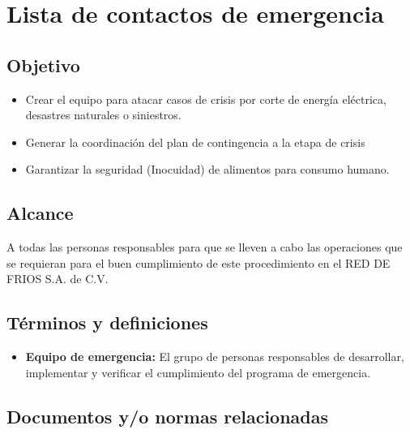 \renewcommand{\MayorVer}{2}
\renewcommand{\MenorVer}{1}
\renewcommand{\Codigo}{PSA-1-PROG} %
\renewcommand{\FechaPub}{2023--01}
\renewcommand{\Titulo}{Lista de contactos de emergencia}

\section{\Titulo}


\subsection{Objetivo}

\begin{itemize}
	\item Crear el equipo para atacar casos de crisis por corte de energía eléctrica, desastres naturales o siniestros.
	\item Generar la coordinación del plan de contingencia a la etapa de crisis
	\item Garantizar la seguridad (Inocuidad) de alimentos para consumo humano.
\end{itemize}

\subsection{Alcance}

A todas las personas responsables para que se lleven a cabo las operaciones que se requieran para el buen cumplimiento de este procedimiento en el RED DE FRIOS S.A. de C.V.

\subsection{Términos y definiciones}

\begin{itemize}
	\item \textbf{Equipo de emergencia:} El grupo de personas responsables de desarrollar, implementar y verificar el cumplimiento del programa de emergencia.
\end{itemize}

\subsection{Documentos y/o normas relacionadas}

